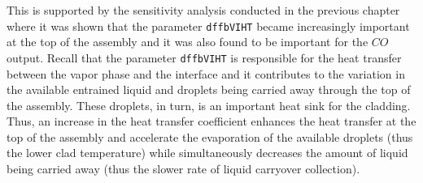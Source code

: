 This is supported by the sensitivity analysis conducted in the previous chapter where it was shown that the parameter \texttt{dffbVIHT} became increasingly important at the top of the assembly and it was also found to be important for the $CO$ output.
Recall that the parameter \texttt{dffbVIHT} is responsible for the heat transfer between the vapor phase and the interface and it contributes to the variation in the available entrained liquid and droplets being carried away through the top of the assembly.
These droplets, in turn, is an important heat sink for the cladding.
Thus, an increase in the heat transfer coefficient enhances the heat transfer at the top of the assembly and accelerate the evaporation of the available droplets (thus the lower clad temperature) while simultaneously decreases the amount of liquid being carried away (thus the slower rate of liquid carryover collection).

